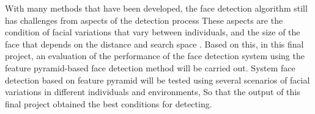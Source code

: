 With many methods that have been developed, the face detection algorithm still has challenges from aspects of the detection process
These aspects are the condition of facial variations that vary between individuals, and the size of the face that depends on the distance and search space \citep{Li_2015_CVPR}.
Based on this, in this final project, an evaluation of the performance of the face detection system using the feature pyramid-based face detection method will be carried out. System
face detection based on feature pyramid will be tested using several scenarios of facial variations in different individuals and environments,
So that the output of this final project obtained the best conditions for detecting.
